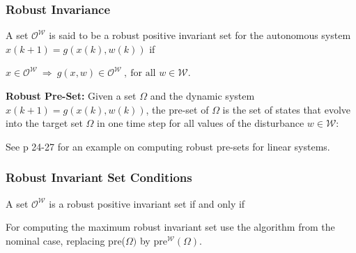 \documentclass[8pt,a4paper]{scrartcl}
\begin{document}
\begin{multicols*}{3}
\finn


\subsubsection{Robust Invariance}

A set $\mathcal{O}^\mathcal{W}$ is said to be a robust positive invariant set for the autonomous system $x(k+1)=g(x(k),w(k))$ if

$x\in\mathcal{O}^\mathcal{W}\ \Rightarrow\ g(x,w)\in\mathcal{O}^\mathcal{W}\ ,\ \text{for all }w\in\mathcal{W}$.

\finn

\textbf{Robust Pre-Set: }Given a set $\Omega$ and the dynamic system $x(k+1)=g(x(k),w(k))$, the pre-set of $\Omega$ is the set of states that evolve into the target set $\Omega$ in one time step for all values of the disturbance $w\in\mathcal{W}$:


See p 24-27 for an example on computing robust pre-sets for linear systems.

\subsubsection{Robust Invariant Set Conditions}

A set $\mathcal{O}^\mathcal{W}$ is a robust positive invariant set if and only if 



For computing the maximum robust invariant set use the algorithm from the nominal case, replacing pre($\Omega)$ by $\text{pre}^\mathcal{W}(\Omega)$.


\end{multicols*}
\end{document}
